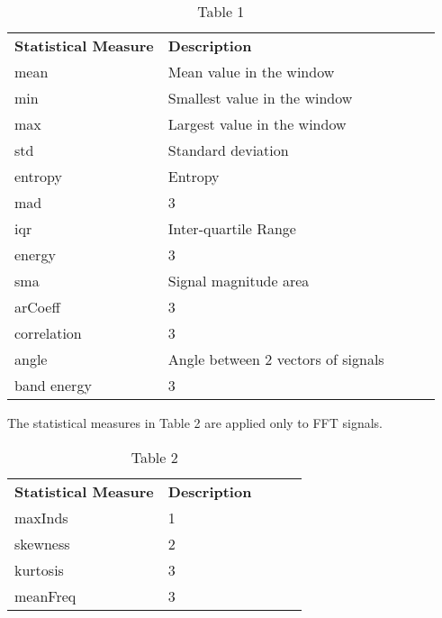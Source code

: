     \begin{table}[ht]
        \begin{tabular}{|l|l|lll}
            \cline{1-2}
            \textbf{Statistical Measure} & \textbf{Description} &  &  &  \\ \cline{1-2}
            mean             & Mean value in the window           &  &  &  \\ \cline{1-2}
            min            & Smallest value in the window           &  &  &  \\ \cline{1-2}
            max            & Largest value in the window           &  &  & \\ \cline{1-2}
            std            & Standard deviation           &  &  & \\ \cline{1-2}
            entropy            & Entropy           &  &  & \\ \cline{1-2}
            mad            & 3           &  &  & \\ \cline{1-2}
            iqr            & Inter-quartile Range           &  &  & \\ \cline{1-2}
            energy            & 3           &  &  & \\ \cline{1-2}
            sma            & Signal magnitude area           &  &  & \\ \cline{1-2}
            arCoeff            & 3           &  &  & \\ \cline{1-2}
            correlation            & 3           &  &  & \\ \cline{1-2}
            angle            & Angle between 2 vectors of signals           &  &  & \\ \cline{1-2}
            band energy            & 3           &  &  & \\ \cline{1-2}
        \end{tabular}
        \caption*{Table 1}
    \end{table}

    The statistical measures in Table 2 are applied only to FFT signals.

    \begin{table}[ht]
        \begin{tabular}{|l|l|lll}
            \cline{1-2}
            \textbf{Statistical Measure} & \textbf{Description} &  &  &  \\ \cline{1-2}
            maxInds             & 1           &  &  &  \\ \cline{1-2}
            skewness            & 2           &  &  &  \\ \cline{1-2}
            kurtosis               & 3           &  &  &  \\ \cline{1-2}
            meanFreq            & 3           &  &  &  \\ \cline{1-2}
        \end{tabular}
        \caption*{Table 2}
    \end{table}


